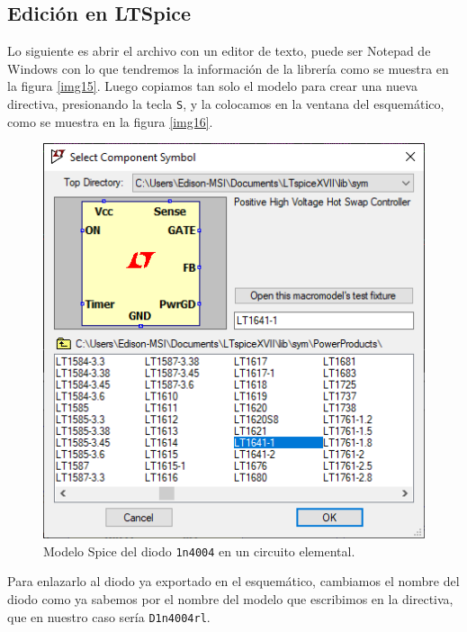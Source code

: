 \documentclass[a4paper]{article} %
\begin{document}
\subsection{Edición en LTSpice}

Lo siguiente es abrir el archivo con un editor de texto, puede ser Notepad de Windows con lo que tendremos la información de la librería como se muestra en la figura \eqref{img15}. Luego copiamos tan solo el modelo para crear una nueva directiva, presionando la tecla \texttt{S}, y la colocamos en la ventana del esquemático, como se muestra en la figura \eqref{img16}.

\begin{figure} %
	\centering %
	\includegraphics[scale=0.4]{IMAGENES/img16} %
	\caption{Modelo Spice del diodo \texttt{1n4004} en un circuito elemental.} %
	\label{img16} %
\end{figure} %

Para enlazarlo al diodo ya exportado en el esquemático, cambiamos el nombre del diodo como ya sabemos por el nombre del modelo que escribimos en la directiva, que en nuestro caso sería \texttt{D1n4004rl}.
\end{document}
